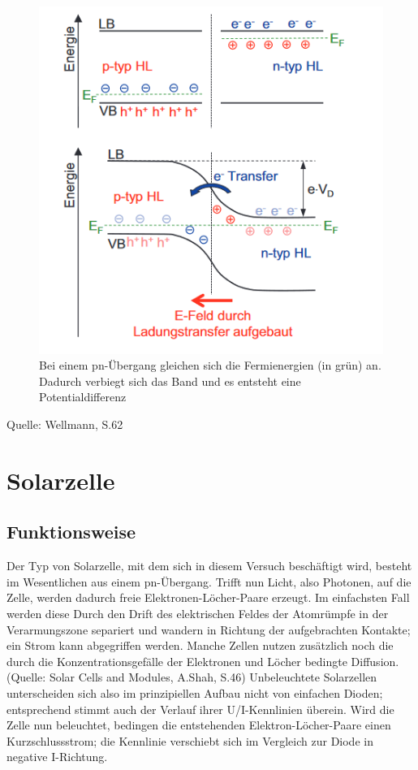 \begin{figure}[h]
    \centering
    \includegraphics[scale=0.5]{Bilder/Bandverbiegung.png}
    \caption{Bei einem pn-Übergang gleichen sich die Fermienergien (in grün) an. Dadurch verbiegt sich das Band und es entsteht eine Potentialdifferenz}
\end{figure}

Quelle: Wellmann, S.62

\section{Solarzelle}
\subsection{Funktionsweise}
Der Typ von Solarzelle, mit dem sich in diesem Versuch beschäftigt wird, besteht im Wesentlichen aus einem pn-Übergang. Trifft nun Licht, also Photonen, auf die Zelle, werden dadurch freie Elektronen-Löcher-Paare erzeugt. Im einfachsten Fall werden diese Durch den Drift des elektrischen Feldes der Atomrümpfe in der Verarmungszone separiert und wandern in Richtung der aufgebrachten Kontakte; ein Strom kann abgegriffen werden. Manche Zellen nutzen zusätzlich noch die durch die Konzentrationsgefälle der Elektronen und Löcher bedingte Diffusion. (Quelle: Solar Cells and Modules, A.Shah, S.46) Unbeleuchtete Solarzellen unterscheiden sich also im prinzipiellen Aufbau nicht von einfachen Dioden; entsprechend stimmt auch der Verlauf ihrer U/I-Kennlinien überein. Wird die Zelle nun beleuchtet, bedingen die entstehenden Elektron-Löcher-Paare einen Kurzschlussstrom; die Kennlinie verschiebt sich im Vergleich zur Diode in negative I-Richtung. \\

